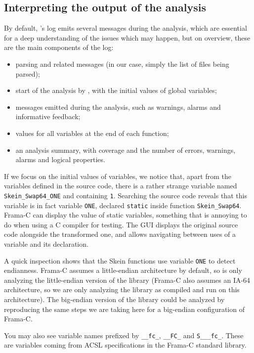 \documentclass{frama-c-book}
\begin{document}
\subsection{Interpreting the output of the analysis}

By default, \Eva{}'s log emits several messages during the analysis, which are
essential for a deep understanding of the issues which may happen, but on
overview, these are the main components of the log:

\begin{itemize}
\item parsing and related messages (in our case, simply the list of files being
  parsed);
\item start of the analysis by \Eva{}, with the initial values of global
  variables;
\item messages emitted during the analysis, such as warnings, alarms and
  informative feedback;
\item values for all variables at the end of each function;
\item an analysis summary, with coverage and the number of
  errors, warnings, alarms and logical properties.
\end{itemize}

If we focus on the initial values of variables, we notice that,
apart from the variables defined in the source code, there
is a rather strange variable named \lstinline|Skein_Swap64_ONE| and containing
\lstinline|1|. Searching the source code reveals that this variable is
in fact variable \verb|ONE|, declared \lstinline|static| inside function
\lstinline|Skein_Swap64|. Frama-C can
display the value of static variables, something that is annoying to
do when using a C compiler for testing.
The GUI displays the original source code alongside the transformed one,
and allows navigating between uses of a variable and its declaration.

A quick inspection shows that the Skein functions
use variable \lstinline|ONE| to detect endianness.
Frama-C assumes a little-endian architecture
by default, so \Eva{} is only analyzing the
little-endian version of the library (Frama-C
also assumes an IA-64 architecture, so we are only
analyzing the library as compiled and run on this architecture).
The big-endian version of the library could be analyzed
by reproducing the same steps we are taking here for
a big-endian configuration of Frama-C.

You may also see variable names
prefixed by \verb|__fc_|, \verb|__FC_| and \verb|S___fc_|.
These are variables coming from ACSL specifications in the Frama-C
standard library.
\end{document}
